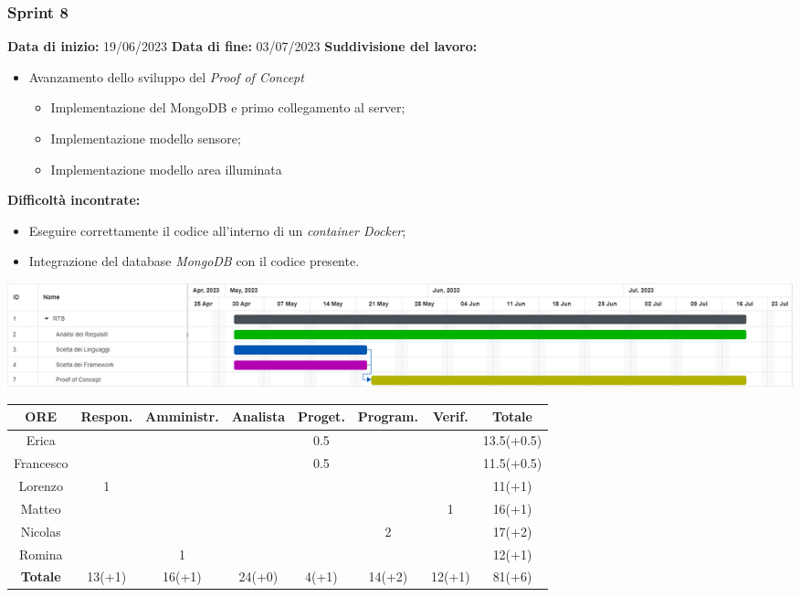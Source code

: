 \documentclass[a4paper, 12pt]{article}
\begin{document}
\subsubsection{Sprint 8}
\textbf{Data di inizio:} 19/06/2023\newline
\textbf{Data di fine:} 03/07/2023\newline
\newline
\textbf{Suddivisione del lavoro:}
\begin{itemize}
    \item Avanzamento dello sviluppo del \textit{Proof of Concept}
    \begin{itemize}
        \item Implementazione del MongoDB e primo collegamento al server;
        \item Implementazione modello sensore;
        \item Implementazione modello area illuminata
    \end{itemize}
\end{itemize}
\textbf{Difficoltà incontrate:}
\begin{itemize}
    \item Eseguire correttamente il codice all'interno di un \textit{container Docker};
    \item Integrazione del database \textit{MongoDB} con il codice presente.
\end{itemize}
\includegraphics[scale=0.24]{RTB_7.png}\newline
\newline
\begin{tabular}{|c|c|c|c|c|c|c|c|}
    \hline
    \textbf{ORE} & \textbf{Respon.} & \textbf{Amministr.} & \textbf{Analista} & \textbf{Proget.} & \textbf{Program.} & \textbf{Verif.} & \textbf{Totale}\\
    \hline
    Erica & & & & 0.5 & & & 13.5(+0.5)\\
    \hline
    Francesco & & & & 0.5 & & & 11.5(+0.5)\\
    \hline
    Lorenzo & 1 & & & & & & 11(+1)\\
    \hline
    Matteo & & & & & & 1 & 16(+1)\\
    \hline
    Nicolas & & & & & 2 & & 17(+2)\\
    \hline
    Romina & & 1 & & & & & 12(+1)\\
    \hline
    \textbf{Totale} & 13(+1) & 16(+1) & 24(+0) & 4(+1) & 14(+2) & 12(+1) & 81(+6)\\
    \hline
\end{tabular}\\[8pt]
\end{document}
